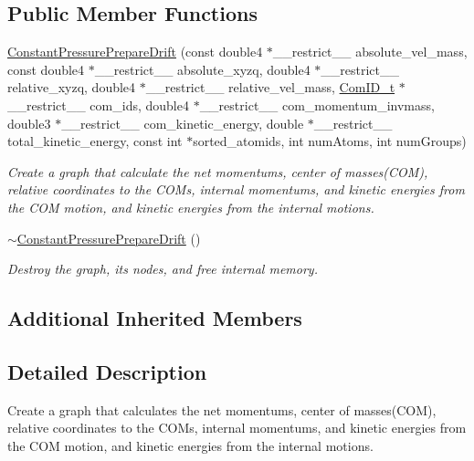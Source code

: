 \subsection*{Public Member Functions}
\begin{DoxyCompactItemize}
\item 
\hyperlink{classConstantPressurePrepareDrift_acdf4bbe89bee70df889d745f1c8cf08c}{Constant\+Pressure\+Prepare\+Drift} (const double4 $\ast$\+\_\+\+\_\+restrict\+\_\+\+\_\+ absolute\+\_\+vel\+\_\+mass, const double4 $\ast$\+\_\+\+\_\+restrict\+\_\+\+\_\+ absolute\+\_\+xyzq, double4 $\ast$\+\_\+\+\_\+restrict\+\_\+\+\_\+ relative\+\_\+xyzq, double4 $\ast$\+\_\+\+\_\+restrict\+\_\+\+\_\+ relative\+\_\+vel\+\_\+mass, \hyperlink{structComID__t}{Com\+I\+D\+\_\+t} $\ast$\+\_\+\+\_\+restrict\+\_\+\+\_\+ com\+\_\+ids, double4 $\ast$\+\_\+\+\_\+restrict\+\_\+\+\_\+ com\+\_\+momentum\+\_\+invmass, double3 $\ast$\+\_\+\+\_\+restrict\+\_\+\+\_\+ com\+\_\+kinetic\+\_\+energy, double $\ast$\+\_\+\+\_\+restrict\+\_\+\+\_\+ total\+\_\+kinetic\+\_\+energy, const int $\ast$sorted\+\_\+atomids, int num\+Atoms, int num\+Groups)
\begin{DoxyCompactList}\small\item\em Create a graph that calculate the net momentums, center of masses(\+C\+O\+M), relative coordinates to the C\+O\+Ms, internal momentums, and kinetic energies from the C\+OM motion, and kinetic energies from the internal motions. \end{DoxyCompactList}\item 
\hyperlink{classConstantPressurePrepareDrift_a0df027b22f65f8ee39387d41e612120b}{$\sim$\+Constant\+Pressure\+Prepare\+Drift} ()
\begin{DoxyCompactList}\small\item\em Destroy the graph, its nodes, and free internal memory. \end{DoxyCompactList}\end{DoxyCompactItemize}
\subsection*{Additional Inherited Members}


\subsection{Detailed Description}
Create a graph that calculates the net momentums, center of masses(\+C\+O\+M), relative coordinates to the C\+O\+Ms, internal momentums, and kinetic energies from the C\+OM motion, and kinetic energies from the internal motions. 



